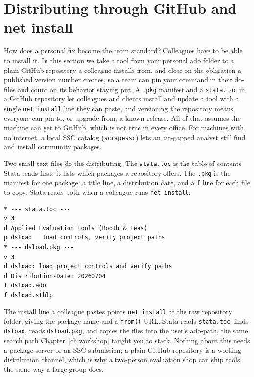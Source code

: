 \documentclass[
    a4paper,
    fontsize=10pt,
    twoside=true,
    numbers=noenddot,
]{kaobook}
\begin{document}
\section{Distributing through GitHub and net install}
How does a personal fix become the team standard? Colleagues have to be able to install it. In this section we take a tool from your personal ado folder to a plain GitHub repository a colleague installs from, and close on the obligation a published version number creates, so a team can pin your command in their do-files and count on its behavior staying put. A \texttt{.pkg} manifest and a \texttt{stata.toc} in a GitHub repository let colleagues and clients install and update a tool with a single \texttt{net install} line they can paste, and versioning the repository means everyone can pin to, or upgrade from, a known release. All of that assumes the machine can get to GitHub, which is not true in every office. For machines with no internet, a local SSC catalog (\texttt{scrapessc}) lets an air-gapped analyst still find and install community packages.

Two small text files do the distributing. The \texttt{stata.toc} is the table of contents Stata reads first: it lists which packages a repository offers. The \texttt{.pkg} is the manifest for one package: a title line, a distribution date, and a \texttt{f} line for each file to copy. Stata reads both when a colleague runs \texttt{net install}:
\par
{\footnotesize
\begin{verbatim}
* --- stata.toc ---
v 3
d Applied Evaluation tools (Booth & Teas)
p dsload   load controls, verify project paths
* --- dsload.pkg ---
v 3
d dsload: load project controls and verify paths
d Distribution-Date: 20260704
f dsload.ado
f dsload.sthlp
\end{verbatim}
}
The install line a colleague pastes points \texttt{net install} at the raw repository folder, giving the package name and a \texttt{from()} URL. Stata reads \texttt{stata.toc}, finds \texttt{dsload}, reads \texttt{dsload.pkg}, and copies the files into the user's ado-path, the same search path Chapter~\ref{ch:workshop} taught you to stack. Nothing about this needs a package server or an SSC submission; a plain GitHub repository is a working distribution channel, which is why a two-person evaluation shop can ship tools the same way a large group does.
\end{document}
